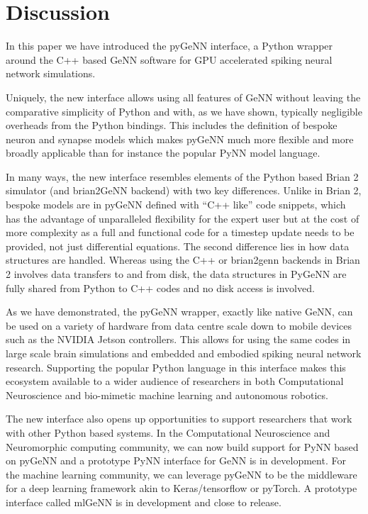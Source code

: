 \documentclass[utf8]{frontiersSCNS} %
\begin{document}
\section{Discussion}
In this paper we have introduced the pyGeNN interface, a Python wrapper around the C++ based GeNN software for GPU accelerated spiking neural network simulations.

Uniquely, the new interface allows using all features of GeNN without leaving the comparative simplicity of Python and with, as we have shown, typically negligible overheads from the Python bindings. This includes the definition of bespoke neuron and synapse models which makes pyGeNN much more flexible and more broadly applicable than for instance the popular PyNN model language.

In many ways, the new interface resembles elements of the Python based Brian 2 simulator (and brian2GeNN backend) with two key differences. Unlike in Brian 2, bespoke models are in pyGeNN defined with ``C++ like'' code snippets, which has the advantage of unparalleled flexibility for the expert user but at the cost of more complexity as a full and functional code for a timestep update needs to be provided, not just differential equations. The second difference lies in how data structures are handled. Whereas using the C++ or brian2genn backends in Brian 2 involves data transfers to and from disk, the data structures in PyGeNN are fully shared from Python to C++ codes and no disk access is involved.

As we have demonstrated, the pyGeNN wrapper, exactly like native GeNN, can be used on a variety of hardware from data centre scale down to mobile devices such as the NVIDIA Jetson controllers. This allows for using the same codes in large scale brain simulations and embedded and embodied spiking neural network research. Supporting the popular Python language in this interface makes this ecosystem available to a wider audience of researchers in both Computational Neuroscience and bio-mimetic machine learning and autonomous robotics.

The new interface also opens up opportunities to support researchers that work with other Python based systems. In the Computational Neuroscience and Neuromorphic computing community, we can now build support for PyNN based on pyGeNN and a prototype PyNN interface for GeNN is in development. For the machine learning community, we can leverage pyGeNN to be the middleware for a deep learning framework akin to Keras/tensorflow or pyTorch. A prototype interface called mlGeNN is in development and close to release.
\end{document}
